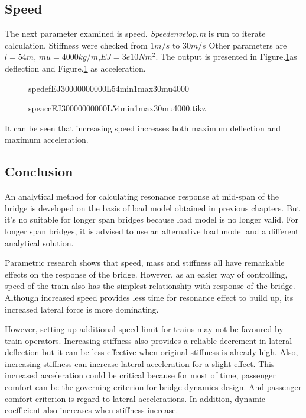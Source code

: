 \subsection{Speed}

The next parameter examined is speed. \textit{Speedenvelop.m} is run to iterate calculation. Stiffness were checked from $1m/s$ to $30m/s$ Other parameters are $l=54m$, $mu=4000kg/m$,$EJ = 3e10 Nm^2$. The output is presented in Figure.\ref{fig:spedefEJ30000000000L54min1max30mu4000.tikz}as deflection and Figure.\ref{fig:spedefEJ30000000000L54min1max30mu4000.tikz} as acceleration.

\begin{figure}[h!]
\centering 
\setlength\figureheight{6cm} 
\setlength\figurewidth{6cm} 
 
\caption{spedefEJ30000000000L54min1max30mu4000} 
\label{fig:spedefEJ30000000000L54min1max30mu4000.tikz} 
\end{figure}


\begin{figure}[h!]
\centering 
\setlength\figureheight{6cm} 
\setlength\figurewidth{6cm} 
 
\caption{speaccEJ30000000000L54min1max30mu4000.tikz} 
\label{fig:speaccEJ30000000000L54min1max30mu4000} 
\end{figure}

It can be seen that increasing speed increases both maximum deflection and maximum acceleration. 

\subsection{Conclusion}

An analytical method for calculating resonance response at mid-span of the bridge is developed on the basis of load model obtained in previous chapters. But it's no suitable for longer span bridges because load model is no longer valid. For longer span bridges, it is advised to use an alternative load model and a different analytical solution.

Parametric research shows that speed, mass and stiffness all have remarkable effects on the response of the bridge. However, as an easier way of controlling, speed of the train also has the simplest relationship with response of the bridge. Although increased speed provides less time for resonance effect to build up, its increased lateral force is more dominating. 

However, setting up additional speed limit for trains may not be favoured by train operators. Increasing stiffness also provides a reliable decrement in lateral deflection but it can be less effective when original stiffness is already high. Also, increasing stiffness can increase lateral acceleration for a slight effect. This increased acceleration could be critical because for most of time, passenger comfort can be the governing criterion for bridge dynamics design. And passenger comfort criterion is regard to lateral accelerations. In addition, dynamic coefficient also increases when stiffness increase. 

